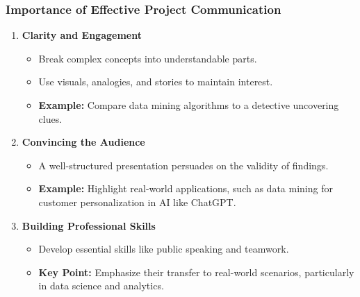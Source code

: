 \documentclass[aspectratio=169]{beamer}
\begin{document}
\begin{frame}[fragile]
    \frametitle{Importance of Effective Project Communication}
    \begin{enumerate}
        \item \textbf{Clarity and Engagement}
        \begin{itemize}
            \item Break complex concepts into understandable parts.
            \item Use visuals, analogies, and stories to maintain interest.
            \item \textbf{Example:} Compare data mining algorithms to a detective uncovering clues.
        \end{itemize}

        \item \textbf{Convincing the Audience}
        \begin{itemize}
            \item A well-structured presentation persuades on the validity of findings.
            \item \textbf{Example:} Highlight real-world applications, such as data mining for customer personalization in AI like ChatGPT.
        \end{itemize}

        \item \textbf{Building Professional Skills}
        \begin{itemize}
            \item Develop essential skills like public speaking and teamwork.
            \item \textbf{Key Point:} Emphasize their transfer to real-world scenarios, particularly in data science and analytics.
        \end{itemize}
    \end{enumerate}
\end{frame}
\end{document}
